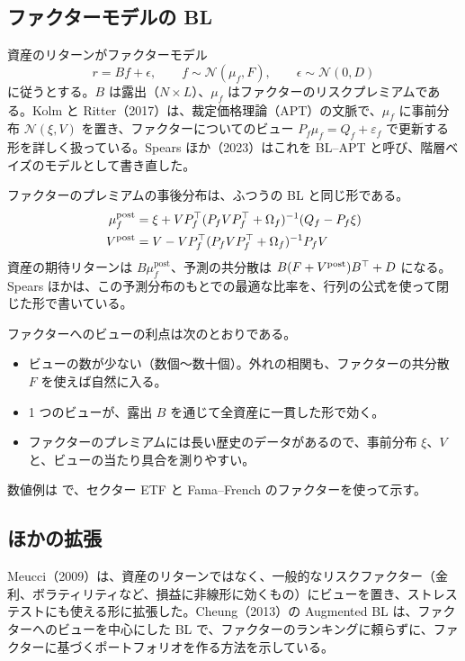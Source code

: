 \subsection*{ファクターモデルの BL}

資産のリターンがファクターモデル
\begin{equation}
r=Bf+\epsilon,\qquad f\sim\mathcal N(\mu_f,F),\qquad \epsilon\sim\mathcal N(0,D)
\end{equation}
に従うとする。$B$ は露出（$N\times L$）、$\mu_f$ はファクターのリスクプレミアムである。Kolm と Ritter（2017）は、裁定価格理論（APT）の文脈で、$\mu_f$ に事前分布 $\mathcal N(\xi,V)$ を置き、ファクターについてのビュー $P_f\mu_f=Q_f+\varepsilon_f$ で更新する形を詳しく扱っている。Spears ほか（2023）はこれを BL--APT と呼び、階層ベイズのモデルとして書き直した。

ファクターのプレミアムの事後分布は、ふつうの BL と同じ形である。
\begin{align}
\mu_f^{\mathrm{post}}&=\xi+VP_f^{\top}(P_fVP_f^{\top}+\Omega_f)^{-1}(Q_f-P_f\xi)\\
V^{\mathrm{post}}&=V-VP_f^{\top}(P_fVP_f^{\top}+\Omega_f)^{-1}P_fV
\end{align}
資産の期待リターンは $B\mu_f^{\mathrm{post}}$、予測の共分散は $B(F+V^{\mathrm{post}})B^{\top}+D$ になる。Spears ほかは、この予測分布のもとでの最適な比率を、行列の公式を使って閉じた形で書いている。

ファクターへのビューの利点は次のとおりである。

\begin{itemize}
\item ビューの数が少ない（数個〜数十個）。外れの相関も、ファクターの共分散 $F$ を使えば自然に入る。
\item 1 つのビューが、露出 $B$ を通じて全資産に一貫した形で効く。
\item ファクターのプレミアムには長い歴史のデータがあるので、事前分布 $\xi$、$V$ と、ビューの当たり具合を測りやすい。
\end{itemize}

数値例は  で、セクター ETF と Fama--French のファクターを使って示す。

\subsection*{ほかの拡張}

Meucci（2009）は、資産のリターンではなく、一般的なリスクファクター（金利、ボラティリティなど、損益に非線形に効くもの）にビューを置き、ストレステストにも使える形に拡張した。Cheung（2013）の Augmented BL は、ファクターへのビューを中心にした BL で、ファクターのランキングに頼らずに、ファクターに基づくポートフォリオを作る方法を示している。

